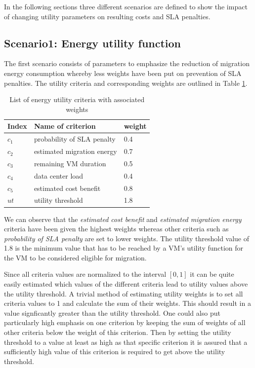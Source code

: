 In the following sections three different scenarios are defined to show the impact of changing utility parameters on resulting costs and SLA penalties.

\subsection{Scenario1: Energy utility function}

The first scenario consists of parameters to emphasize the reduction of migration energy consumption whereby less weights have been put on prevention of SLA penalties. 
The utility criteria and corresponding weights are outlined in Table \ref{tab:list_of_energy_utility_criteria_weights}. 

\begin{table}[htbp]
\centering
\begin{tabular}{lll}
\toprule
	Index & Name of criterion	& weight \\
\midrule
	$c_1$ & probability of SLA penalty & 0.4 \\
	$c_2$ & estimated migration energy & 0.7 \\
	$c_3$ & remaining VM duration & 0.5 \\
	$c_4$ & data center load & 0.4 \\
	$c_5$ & estimated cost benefit & 0.8 \\
	$ut$ & utility threshold & 1.8 \\
\bottomrule
\end{tabular}
\caption{List of energy utility criteria with associated weights}
\label{tab:list_of_energy_utility_criteria_weights}
\end{table}

We can observe that the \textit{estimated cost benefit} and \textit{estimated migration energy} criteria have been given the highest weights whereas other criteria such as \textit{probability of SLA penalty} are set to lower weights. 
The utility threshold value of 1.8 is the minimum value that has to be reached by a VM's utility function for the VM to be considered eligible for migration. 

Since all criteria values are normalized to the interval $[0,1]$ it can be quite easily estimated which values of the different criteria lead to utility values above the utility threshold. A trivial method of estimating utility weights is to set all criteria values to 1 and calculate the sum of their weights. This should result in a value signficantly greater than the utility threshold. One could also put particularly high emphasis on one criterion by keeping the sum of weights of all other criteria below the weight of this criterion. Then by setting the utility threshold to a value at least as high as that specific criterion it is assured that a sufficiently high value of this criterion is required to get above the utility threshold. 

